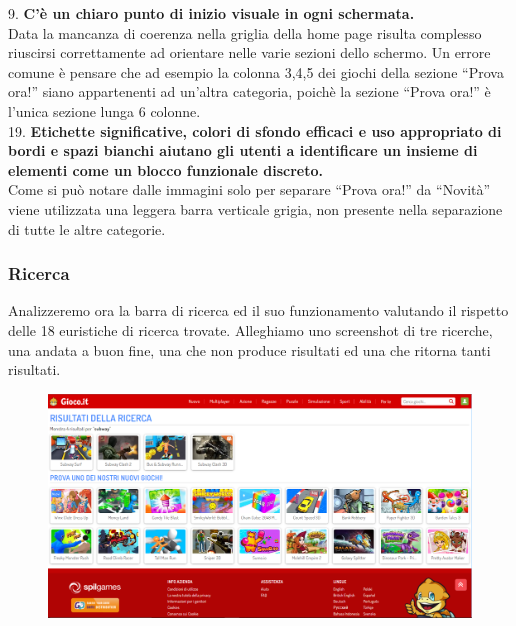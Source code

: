 \documentclass[../Report.tex]{subfiles}
\begin{document}
    9. \textbf{C’è un chiaro punto di inizio visuale in ogni schermata.}\\
    Data la mancanza di coerenza nella griglia della home page risulta complesso riuscirsi correttamente ad orientare nelle varie sezioni dello schermo. Un errore comune è pensare che ad esempio la colonna 3,4,5 dei giochi della sezione “Prova ora!” siano appartenenti ad un’altra categoria, poichè la sezione “Prova ora!” è l’unica sezione lunga 6 colonne.\\

    19. \textbf{Etichette significative, colori di sfondo efficaci e uso appropriato di bordi e spazi bianchi aiutano gli utenti a identificare un insieme di elementi come un blocco funzionale discreto.}\\
	Come si può notare dalle immagini solo per separare “Prova ora!” da “Novità” viene utilizzata una leggera barra verticale grigia, non presente nella separazione di tutte le altre categorie.

    \subsubsection{Ricerca}
    Analizzeremo ora la barra di ricerca ed il suo funzionamento valutando il rispetto delle 18 euristiche di ricerca trovate. Alleghiamo uno screenshot di tre ricerche, una andata a buon fine, una che non produce risultati ed una che ritorna tanti risultati.

    \begin{figure}[H]
        \includegraphics[width=\linewidth]{Assestment3.png}
        \centering
    \end{figure}
\end{document}
